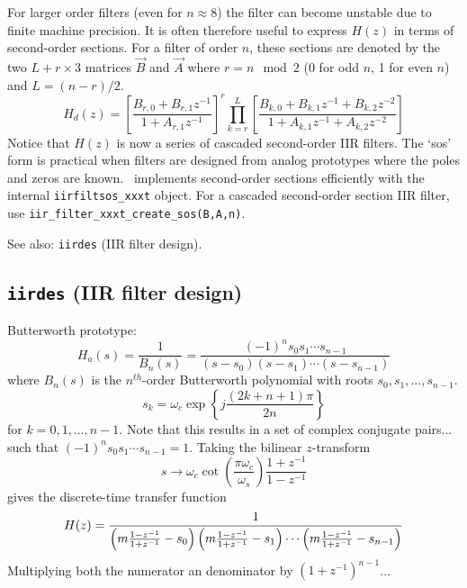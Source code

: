 For larger order filters (even for $n\approx 8$) the filter can become
unstable due to finite machine precision.
It is often therefore useful to express $H(z)$ in terms of second-order
sections.
For a filter of order $n$, these sections are denoted by the two $L+r\times 3$
matrices $\vec{B}$ and $\vec{A}$
where $r=n \mod 2$ (0 for odd $n$, 1 for even $n$) and $L=(n-r)/2$.
\[
    H_d(z) = 
             \left[
                \frac{B_{r,0} + B_{r,1}z^{-1}}
                     {1       + A_{r,1}z^{-1}}
             \right]^r
             \prod_{k=r}^{L} {\left[
                \frac{B_{k,0} + B_{k,1}z^{-1} + B_{k,2}z^{-2}}
                     {1       + A_{k,1}z^{-1} + A_{k,2}z^{-2}}
             \right]}
\]
Notice that $H(z)$ is now a series of cascaded second-order IIR filters.
The `sos' form is practical when filters are designed from analog prototypes
where the poles and zeros are known.
\liquid\ implements second-order sections efficiently with the internal
{\tt iirfiltsos\_xxxt} object.
For a cascaded second-order section IIR filter, use
{\tt iir\_filter\_xxxt\_create\_sos(B,A,n)}.

See also: {\tt iirdes} (IIR filter design).



\subsection{{\tt iirdes} (IIR filter design)}
Butterworth prototype:
\[
    H_a(s) = \frac{1}{B_n(s)}
           = \frac{
                (-1)^n s_0 s_1 \cdots s_{n-1}
            }{
                (s-s_0)(s-s_1) \cdots (s-s_{n-1})
            }
\]
where $B_n(s)$ is the $n^{th}$-order Butterworth polynomial with roots
$s_0,s_1,\ldots,s_{n-1}$.
\[
    s_k = \omega_c \exp\left\{
                j \frac{\left(2k+n+1\right)\pi}{2n}
          \right\}
\]
for $k=0,1,\ldots,n-1$.
Note that this results in a set of complex conjugate pairs... such that
$(-1)^n s_0 s_1 \cdots s_{n-1} = 1$.
Taking the bilinear $z$-transform
\[
    s \rightarrow \omega_c
                  \cot\left(\frac{\pi \omega_c}{\omega_s}\right)
                  \frac{1+z^{-1}}{1-z^{-1}}
\]
gives the discrete-time transfer function
\[
    H(z) = \frac{
            1
           }{
            \left(m\frac{1-z^{-1}}{1+z^{-1}}-s_0\right)
            \left(m\frac{1-z^{-1}}{1+z^{-1}}-s_1\right)
            \cdots
            \left(m\frac{1-z^{-1}}{1+z^{-1}}-s_{n-1}\right)
           }
\]
Multiplying both the numerator an denominator by $(1+z^{-1})^{n-1}$...

